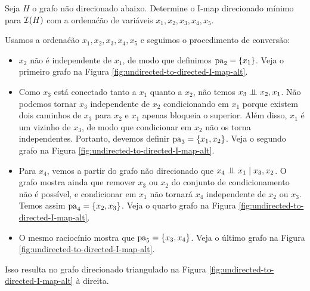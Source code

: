\begin{exenumerate}
\item Seja $H$ o grafo n\~ao direcionado abaixo. Determine o I-map direcionado m\'inimo para $\mathcal{I}(H)$ com a ordena\'c\~ao de vari\'aveis $x_1, x_2, x_3, x_4, x_5$.
\label{q:undirected-to-directed-I-map-alt}
\begin{center}
\end{center}

\begin{solution}
    Usamos a ordena\'c\~ao $x_1, x_2, x_3, x_4, x_5$ e seguimos o procedimento de convers\~ao:
    
    \begin{itemize}
        \item $x_2$ n\~ao \'e independente de $x_1$, de modo que definimos $\mathrm{pa}_2 =\{x_1\}$. Veja o primeiro grafo na Figura \ref{fig:undirected-to-directed-I-map-alt}.
        \item Como $x_3$ est\'a conectado tanto a $x_1$ quanto a $x_2$, n\~ao temos $x_3 \mathrel{\perp\mspace{-10mu}\perp} x_2, x_1$. N\~ao podemos tornar $x_3$ independente de $x_2$ condicionando em $x_1$ porque existem dois caminhos de $x_3$ para $x_2$ e $x_1$ apenas bloqueia o superior. Al\'em disso, $x_1$ \'e um vizinho de $x_3$, de modo que condicionar em $x_2$ n\~ao os torna independentes. Portanto, devemos definir $\mathrm{pa}_3 = \{x_1, x_2\}$. Veja o segundo grafo na Figura \ref{fig:undirected-to-directed-I-map-alt}.
        \item Para $x_4$, vemos a partir do grafo n\~ao direcionado que $x_4 \mathrel{\perp\mspace{-10mu}\perp} x_1 \mid x_3, x_2$. O grafo mostra ainda que remover $x_3$ ou $x_2$ do conjunto de condicionamento n\~ao \'e poss\'ivel, e condicionar em $x_1$ n\~ao tornar\'a $x_4$ independente de $x_2$ ou $x_3$. Temos assim $\mathrm{pa}_4 = \{x_2, x_3\}$. Veja o quarto grafo na Figura \ref{fig:undirected-to-directed-I-map-alt}.
        \item O mesmo racioc\'inio mostra que $\mathrm{pa}_5 = \{x_3,x_4\}$. Veja o \'ultimo grafo na Figura \ref{fig:undirected-to-directed-I-map-alt}.
    \end{itemize}
    Isso resulta no grafo direcionado triangulado na Figura \ref{fig:undirected-to-directed-I-map-alt} \`a direita.
    

\end{solution}
\end{exenumerate}
